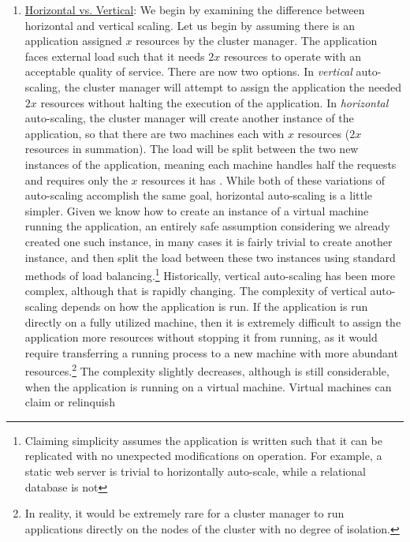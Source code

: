 \begin{enumerate}
  \item \underline{Horizontal vs. Vertical}: We begin by examining
    the difference between horizontal and vertical scaling.
    Let us begin by assuming there is an application assigned $x$ resources by the
    cluster manager. The application
    faces external load such that it needs $2x$ resources to operate with an
    acceptable quality of service. There are now two options. In
    \textit{vertical} auto-scaling, the cluster manager will attempt to assign
    the application the needed $2x$ resources
    without halting the execution of the application. In \textit{horizontal}
    auto-scaling, the cluster manager will create another instance of
    the application, so that there are two machines each with
    $x$ resources ($2x$ resources in summation). The load will be split between
    the two new instances of the application, meaning each machine handles half
    the requests and requires only the $x$ resources it has
    \cite{auto-scaling-techniques-for-elastic-applications-in-cloud-environments}. While
    both of these variations of auto-scaling accomplish the same goal, horizontal
    auto-scaling is a little simpler. Given we know how to create an instance of a
    virtual machine running the application, an entirely safe assumption
    considering we already created one such instance, in many cases it is
    fairly trivial to create
    another instance, and then split the load between these two instances using
    standard methods of load balancing.\footnote{Claiming
    simplicity assumes the application is written
    such that it can be replicated with no unexpected modifications
    on operation. For example, a static web server is trivial to horizontally
    auto-scale, while a relational database is not}
    Historically, vertical auto-scaling has been more complex,
    although that is rapidly changing.
    The complexity of vertical auto-scaling depends on how the application
    is run. If the application is run directly on a fully utilized machine,
    then it is extremely difficult to assign the application more resources
    without stopping it from running, as it would require transferring a running
    process to a new machine with more abundant resources.\footnote{In reality,
    it would be extremely rare for a cluster manager to run applications
    directly on the nodes of the cluster with no degree of isolation.} The complexity
    slightly decreases, although is still considerable, when the application is
    running on a virtual machine. Virtual machines can claim or relinquish

\end{enumerate}
